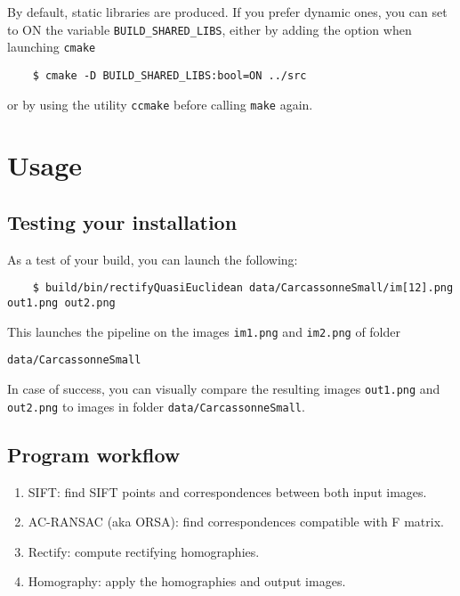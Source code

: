 \documentclass[a4paper]{article}
\begin{document}
By default, static libraries are produced. If you prefer dynamic ones, you can set to ON the variable \texttt{BUILD\_SHARED\_LIBS}, either by adding the option when launching \texttt{cmake}
\begin{verbatim}
    $ cmake -D BUILD_SHARED_LIBS:bool=ON ../src
\end{verbatim}
or by using the utility \texttt{ccmake} before calling \texttt{make} again.

\section{Usage}
\subsection{Testing your installation}
As a test of your build, you can launch the following:
\begin{verbatim}
    $ build/bin/rectifyQuasiEuclidean data/CarcassonneSmall/im[12].png out1.png out2.png
\end{verbatim}
This launches the pipeline on the images \texttt{im1.png} and \texttt{im2.png} of folder
\begin{verbatim}
data/CarcassonneSmall
\end{verbatim}
In case of success, you can visually compare the resulting images \verb|out1.png| and \verb|out2.png| to images in folder \texttt{data/CarcassonneSmall}.

\subsection{Program workflow}
\begin{enumerate}
\item SIFT: find SIFT points and correspondences between both input images.
\item AC-RANSAC (aka ORSA): find correspondences compatible with F matrix.
\item Rectify: compute rectifying homographies.
\item Homography: apply the homographies and output images.
\end{enumerate}
\end{document}
